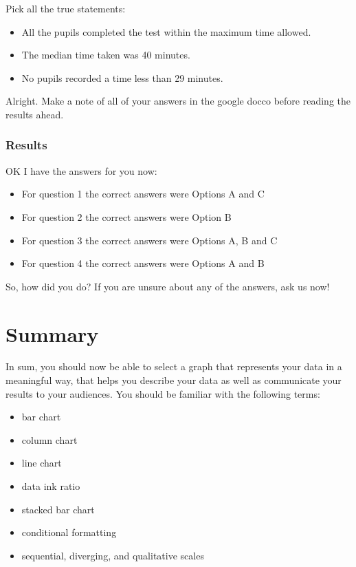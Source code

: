 \documentclass[
]{book}
\providecommand{\tightlist}{%
  \setlength{\itemsep}{0pt}\setlength{\parskip}{0pt}}
\begin{document}
Pick all the true statements:

\begin{itemize}
\tightlist
\item
  All the pupils completed the test within the maximum time allowed.
\item
  The median time taken was 40 minutes.
\item
  No pupils recorded a time less than 29 minutes.
\end{itemize}

Alright. Make a note of all of your answers in the google docco before reading the results ahead.

\hypertarget{results}{%
\subsubsection*{Results}\label{results}}

OK I have the answers for you now:

\begin{itemize}
\tightlist
\item
  For question 1 the correct answers were Options A and C
\item
  For question 2 the correct answers were Option B
\item
  For question 3 the correct answers were Options A, B and C
\item
  For question 4 the correct answers were Options A and B
\end{itemize}

So, how did you do? If you are unsure about any of the answers, ask us now!

\hypertarget{summary-5}{%
\section{Summary}\label{summary-5}}

In sum, you should now be able to select a graph that represents your data in a meaningful way, that helps you describe your data as well as communicate your results to your audiences. You should be familiar with the following terms:

\begin{itemize}
\tightlist
\item
  bar chart
\item
  column chart
\item
  line chart
\item
  data ink ratio
\item
  stacked bar chart
\item
  conditional formatting
\item
  sequential, diverging, and qualitative scales
\end{itemize}
\end{document}
